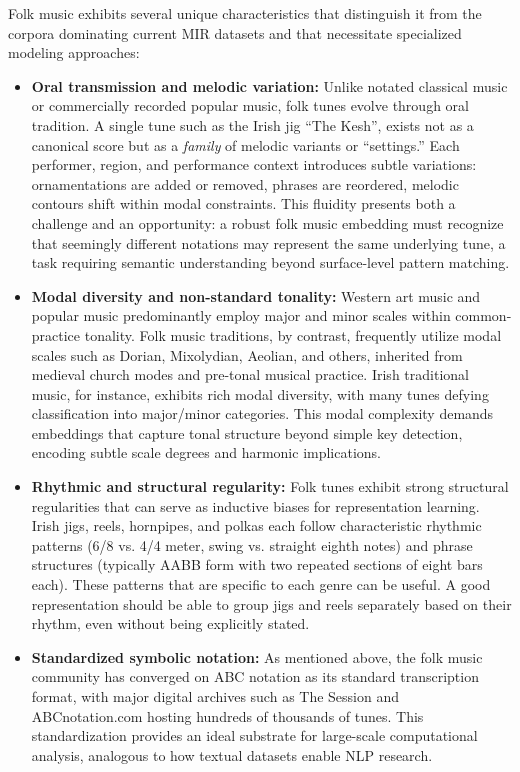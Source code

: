 \documentclass[]{interact}
\theoremstyle{plain}
\theoremstyle{definition}
\theoremstyle{remark}
\begin{document}
Folk music exhibits several unique characteristics that distinguish it from the corpora dominating current MIR datasets and that necessitate specialized modeling approaches:

\begin{itemize}
\item \textbf{Oral transmission and melodic variation:} Unlike notated classical music or commercially recorded popular music, folk tunes evolve through oral tradition. A single tune such as the Irish jig ``The Kesh'', exists not as a canonical score but as a \textit{family} of melodic variants or ``settings.'' Each performer, region, and performance context introduces subtle variations: ornamentations are added or removed, phrases are reordered, melodic contours shift within modal constraints. This fluidity presents both a challenge and an opportunity: a robust folk music embedding must recognize that seemingly different notations may represent the same underlying tune, a task requiring semantic understanding beyond surface-level pattern matching.

\item \textbf{Modal diversity and non-standard tonality:} Western art music and popular music predominantly employ major and minor scales within common-practice tonality\cite{pfleiderer2019beyond}. Folk music traditions, by contrast, frequently utilize modal scales such as Dorian, Mixolydian, Aeolian, and others\cite{tan2017perception}, inherited from medieval church modes and pre-tonal musical practice. Irish traditional music, for instance, exhibits rich modal diversity, with many tunes defying classification into major/minor categories. This modal complexity demands embeddings that capture tonal structure beyond simple key detection, encoding subtle scale degrees and harmonic implications.

\item \textbf{Rhythmic and structural regularity:} Folk tunes exhibit strong structural regularities that can serve as inductive biases for representation learning. Irish jigs, reels, hornpipes, and polkas each follow characteristic rhythmic patterns (6/8 vs. 4/4 meter, swing vs. straight eighth notes) and phrase structures (typically AABB form with two repeated sections of eight bars each). These patterns that are specific to each genre can be useful. A good representation should be able to group jigs and reels separately based on their rhythm, even without being explicitly stated.

\item \textbf{Standardized symbolic notation:} As mentioned above, the folk music community has converged on ABC notation as its standard transcription format, with major digital archives such as The Session and ABCnotation.com hosting hundreds of thousands of tunes. This standardization provides an ideal substrate for large-scale computational analysis, analogous to how textual datasets enable NLP research.


\end{itemize}
\end{document}
